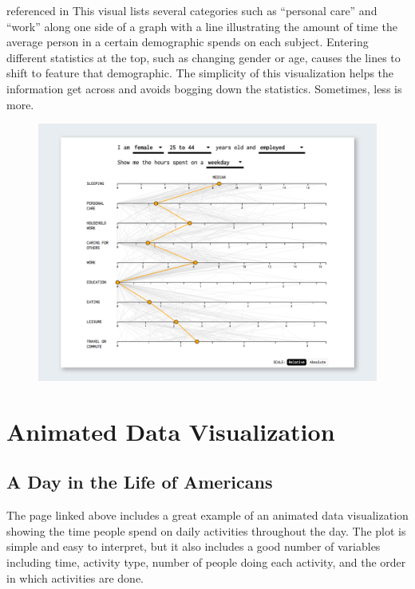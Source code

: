 \documentclass[]{book}
\theoremstyle{definition}
\theoremstyle{definition}
\theoremstyle{definition}
\theoremstyle{remark}
\begin{document}
\citep{spendingtime} referenced in \citep{cool_data} This visual lists
several categories such as ``personal care'' and ``work'' along one side
of a graph with a line illustrating the amount of time the average
person in a certain demographic spends on each subject. Entering
different statistics at the top, such as changing gender or age, causes
the lines to shift to feature that demographic. The simplicity of this
visualization helps the information get across and avoids bogging down
the statistics. Sometimes, less is more.

\begin{figure}
\centering
\includegraphics{images/SpendingTime.png}
\caption{}
\end{figure}

\section{Animated Data Visualization}\label{animated-data-visualization}

\subsection{A Day in the Life of
Americans}\label{a-day-in-the-life-of-americans}

\citep{American_life}

The page linked above includes a great example of an animated data
visualization showing the time people spend on daily activities
throughout the day. The plot is simple and easy to interpret, but it
also includes a good number of variables including time, activity type,
number of people doing each activity, and the order in which activities
are done.
\end{document}
